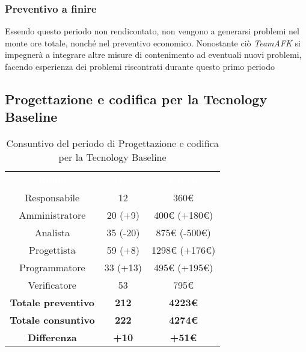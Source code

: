 \subsubsection{Preventivo a finire}
Essendo questo periodo non rendicontato, non vengono a generarsi problemi nel monte ore totale, nonché nel preventivo economico. Nonostante ciò \textit{TeamAFK} si impegnerà a integrare altre misure di contenimento ad eventuali nuovi problemi, facendo esperienza dei problemi riscontrati durante questo primo periodo

\subsection{Progettazione e codifica per la Tecnology Baseline}

\begin{table}[H]
\centering\renewcommand{\arraystretch}{1.5}
\caption{Consuntivo del periodo di Progettazione e codifica per la Tecnology Baseline}
\vspace{0.2cm}
\begin{tabular}{ c c c }
\rowcolor{redafk}
\textcolor{white}{\textbf{Ruolo}} & \textcolor{white}{\textbf{Ore}} &
\textcolor{white}{\textbf{Costo}}  \\
Responsabile 	& 12 & 360€ \\
Amministratore 	& 20 (+9) 	& 400€ (+180€) \\
Analista 		& 35 (-20) 	& 875€ (-500€) \\
Progettista		& 59 (+8) 	& 1298€ (+176€)\\
Programmatore	& 33 (+13) 	& 495€ (+195€)\\
Verificatore 	& 53 & 795€ \\
\textbf{Totale preventivo} & \textbf{212} & \textbf{4223€}  \\
\textbf{Totale consuntivo} & \textbf{222} & \textbf{4274€}  \\
\rowcolor{lastrowcolor}
\textbf{Differenza} & \textbf{+10} & \textbf{+51€}  \\
\end{tabular}
\end{table}

